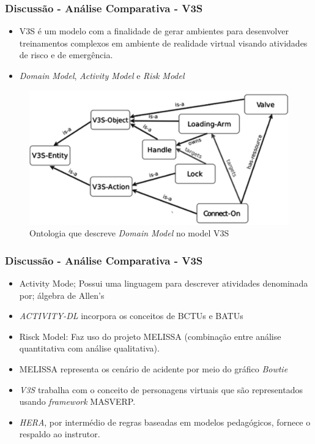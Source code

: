 \documentclass{beamer}
\begin{document}
\begin{frame}
	\frametitle{Discussão - Análise Comparativa - V3S}
	\begin{itemize}
		\item V3S é um modelo com a finalidade de gerar ambientes para desenvolver treinamentos complexos em ambiente de realidade virtual visando atividades de risco e de emergência.
		\item \textit{Domain Model}, \textit{Activity Model} e \textit{Risk Model}
	\end{itemize}
	\begin{figure}[H]
	  \centering
	  \includegraphics[width=0.4\linewidth]{figure/ontologyv3.png} 
	  \caption{Ontologia que descreve \textit{Domain Model} no model V3S \cite{v3sframework}}
	  \label{domainmodel}
	\end{figure}
\end{frame}

\begin{frame}
	\frametitle{Discussão - Análise Comparativa - V3S}
	\begin{itemize}
		\item Activity Mode; Possui uma linguagem para descrever atividades denominada por; álgebra de Allen's
		\item \textit{ACTIVITY-DL} incorpora os conceitos de BCTUs e BATUs
		\item Risck Model: Faz uso do projeto MELISSA (combinação entre análise quantitativa com análise qualitativa).
		\item MELISSA representa os cenário de acidente por meio do gráfico \textit{Bowtie}
		\item \textit{V3S} trabalha com o conceito de personagens virtuais que são representados usando \textit{framework} MASVERP.
		\item \textit{HERA}, por intermédio de regras baseadas em modelos pedagógicos, fornece o respaldo ao instrutor.
	\end{itemize}
\end{frame}
\end{document}
